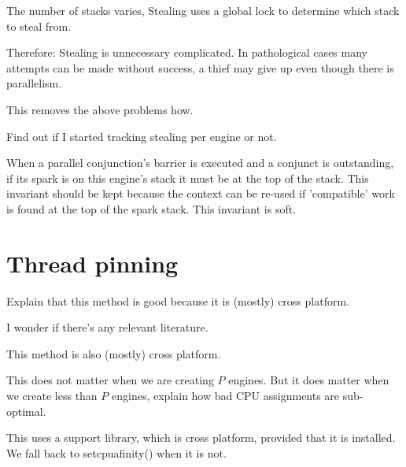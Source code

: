 


The number of stacks varies,
Stealing uses a global lock to determine which stack to steal from.

Therefore:
Stealing is unnecessary complicated.
In pathological cases many attempts can be made without success,
a thief may give up even though there is parallelism.

This removes the above problems how.

Find out if I started tracking stealing per engine or not.

When a parallel conjunction's barrier is executed and a conjunct is
outstanding, if its spark is on this engine's stack it must be at the top of
the stack.
This invariant should be kept because the context can be re-used if
'compatible' work is found at the top of the spark stack.
This invariant is soft.




\section{Thread pinning}
\label{sec:thread_pinning}


Explain that this method is good because it is (mostly) cross platform.

I wonder if there's any relevant literature.

This method is also (mostly) cross platform.

This does not matter when we are creating $P$ engines.
But it does matter when we create less than $P$ engines,
explain how bad CPU assignments are sub-optimal.

This uses a support library, which is cross platform, provided that it is installed.
We fall back to setcpuafinity() when it is not.

